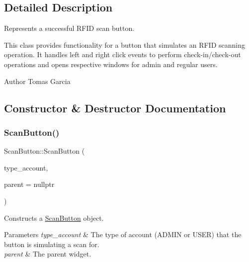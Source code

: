 \subsection{Detailed Description}
Represents a successful R\+F\+ID scan button. 

This class provides functionality for a button that simulates an R\+F\+ID scanning operation. It handles left and right click events to perform check-\/in/check-\/out operations and opens respective windows for admin and regular users.

\begin{DoxyAuthor}{Author}
Tomas Garcia 
\end{DoxyAuthor}


\subsection{Constructor \& Destructor Documentation}
\mbox{\label{classScanButton_a85de89a14f571d120f1d602c5642c28d}} 
\subsubsection{\texorpdfstring{Scan\+Button()}{ScanButton()}}
{\footnotesize\ttfamily Scan\+Button\+::\+Scan\+Button (\begin{DoxyParamCaption}\item[{int}]{type\+\_\+account,  }\item[{Q\+Widget $\ast$}]{parent = {\ttfamily nullptr} }\end{DoxyParamCaption})}



Constructs a \hyperlink{classScanButton}{Scan\+Button} object. 


\begin{DoxyParams}{Parameters}
{\em type\+\_\+account} & The type of account (A\+D\+M\+IN or U\+S\+ER) that the button is simulating a scan for. \\
\hline
{\em parent} & The parent widget. \\
\hline
\end{DoxyParams}
\mbox{\label{classScanButton_a080940ebdacd95fa1c2b03895da87e57}} 
